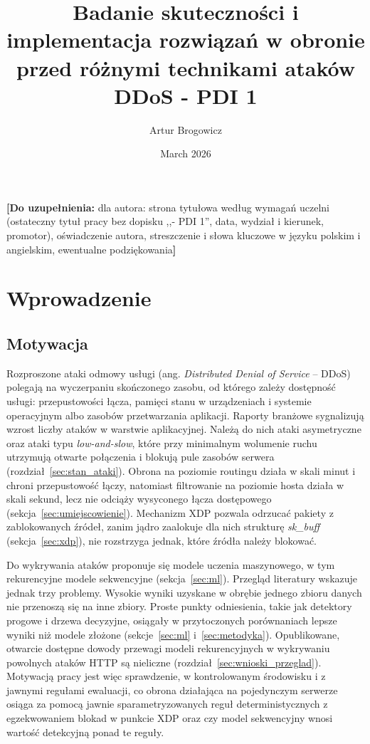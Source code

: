 \documentclass[a4paper,12pt]{article}
\title{Badanie skuteczności i implementacja rozwiązań w obronie przed różnymi technikami ataków DDoS - PDI 1}
\author{Artur Brogowicz }
\date{March 2026}
\newcommand{\doUzupelnienia}[1]{\textcolor{red!70!black}{\textbf{[Do uzupełnienia:} #1\textbf{]}}}
\begin{document}
\maketitle
\doUzupelnienia{dla autora: strona tytułowa według wymagań uczelni (ostateczny tytuł pracy bez dopisku ,,- PDI 1'', data, wydział i kierunek, promotor), oświadczenie autora, streszczenie i słowa kluczowe w języku polskim i angielskim, ewentualne podziękowania}
\tableofcontents
\newpage

\section{Wprowadzenie}\label{sec:wprowadzenie}
\subsection{Motywacja}
Rozproszone ataki odmowy usługi (ang. \textit{Distributed Denial of Service} -- DDoS) polegają na wyczerpaniu skończonego zasobu, od którego zależy dostępność usługi: przepustowości łącza, pamięci stanu w urządzeniach i systemie operacyjnym albo zasobów przetwarzania aplikacji. Raporty branżowe sygnalizują wzrost liczby ataków w warstwie aplikacyjnej. Należą do nich ataki asymetryczne oraz ataki typu \textit{low-and-slow}, które przy minimalnym wolumenie ruchu utrzymują otwarte połączenia i blokują pule zasobów serwera (rozdział~\ref{sec:stan_ataki}). Obrona na poziomie routingu działa w skali minut i chroni przepustowość łączy, natomiast filtrowanie na poziomie hosta działa w skali sekund, lecz nie odciąży wysyconego łącza dostępowego (sekcja~\ref{sec:umiejscowienie}). Mechanizm XDP pozwala odrzucać pakiety z zablokowanych źródeł, zanim jądro zaalokuje dla nich strukturę \textit{sk\_buff} (sekcja~\ref{sec:xdp}), nie rozstrzyga jednak, które źródła należy blokować.

Do wykrywania ataków proponuje się modele uczenia maszynowego, w tym rekurencyjne modele sekwencyjne (sekcja~\ref{sec:ml}). Przegląd literatury wskazuje jednak trzy problemy. Wysokie wyniki uzyskane w obrębie jednego zbioru danych nie przenoszą się na inne zbiory. Proste punkty odniesienia, takie jak detektory progowe i drzewa decyzyjne, osiągały w przytoczonych porównaniach lepsze wyniki niż modele złożone (sekcje~\ref{sec:ml} i~\ref{sec:metodyka}). Opublikowane, otwarcie dostępne dowody przewagi modeli rekurencyjnych w wykrywaniu powolnych ataków HTTP są nieliczne (rozdział~\ref{sec:wnioski_przeglad}). Motywacją pracy jest więc sprawdzenie, w kontrolowanym środowisku i z jawnymi regułami ewaluacji, co obrona działająca na pojedynczym serwerze osiąga za pomocą jawnie sparametryzowanych reguł deterministycznych z egzekwowaniem blokad w punkcie XDP oraz czy model sekwencyjny wnosi wartość detekcyjną ponad te reguły.
\end{document}
